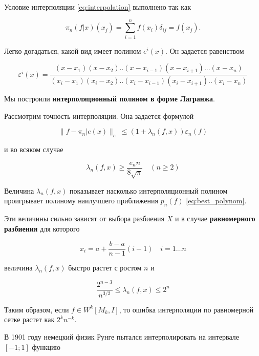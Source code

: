Условие интерполяции \ref{eq:interpolation} выполнено так как 

\begin{equation}
\pi_n(f|x)(x_j) = \sum_{i = 1}^{n} f(x_i)\delta_{ij} = f(x_j).
\end{equation}

Легко догадаться, какой вид имеет полином $e^i(x)$. Он задается равенством 

\begin{equation} \label{eq:2.21}
\varepsilon^i(x) = \frac{(x-x_1)(x-x_2)..(x-x_{i-1})(x-x_{i+1}) ...(x-x_n)}{(x_i-x_1)(x_i-x_2)..(x_i-x_{i-1})(x_i-x_{i+1})..(x_i - x_n )}
\end{equation}

Мы построили \textbf{интерполяционный полином в форме Лагранжа}. 

Рассмотрим точность интерполяции. Она задается формулой 

\begin{equation}
\parallel f - \pi_n| e(x) \parallel_c \; \leq (1+ \lambda_n(f, x))\varepsilon_n(f)
\end{equation}

и во всяком случае 

\begin{equation}
\lambda_n(f, x) \geq \frac{e_n n}{8 \sqrt{\pi}} \quad (n \geq 2)
\end{equation}

Величина $\lambda_n(f, x)$ показывает насколько интерполяционный полином проигрывает полиному наилучшего приближения $p_n(f)$ \ref{eq:best_polynom}.


Эти величины сильно зависят от выбора разбиения $X$ и в случае \textbf{равномерного разбиения} для которого

\begin{equation} \label{eq:2.24}
x_i = a + \frac{b-a}{n-1}(i-1) \quad i = 1...n
\end{equation}

величина $\lambda_n(f, x)$ быстро растет с ростом $n$ и


\begin{equation}
\frac{2^{n-3}}{n^{3/2}} \leq \lambda_n(f, x) \leq 2^n
\end{equation} 


Таким образом, если  $f \in W^k[M_k, I]$, то ошибка интерполяции по равномерной сетке растет как $2^kn^{-k}$.

В 1901 году немецкий физик Рунге пытался интерполировать на интервале $[-1; 1]$ функцию

